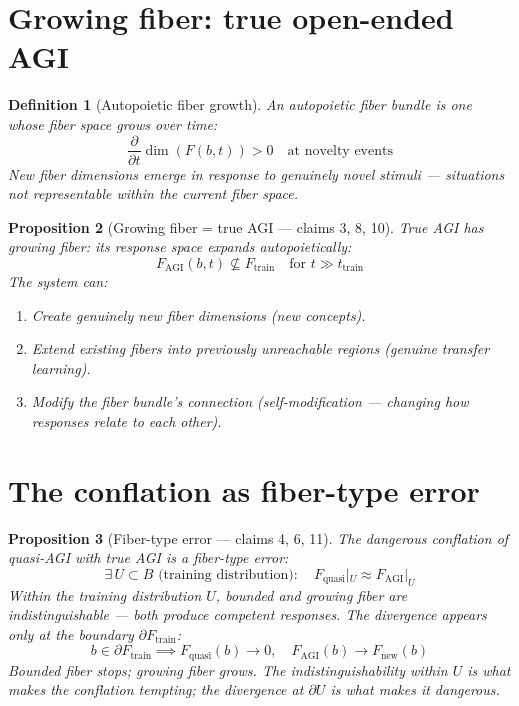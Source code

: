 \documentclass[11pt,a4paper]{article}
\newtheorem{definition}{Definition}[section]
\newtheorem{proposition}[definition]{Proposition}
\begin{document}
\section{Growing fiber: true open-ended AGI}

\begin{definition}[Autopoietic fiber growth]
An \emph{autopoietic fiber bundle} is one whose fiber space grows over time:
\[
  \frac{\partial}{\partial t} \dim(F(b, t)) > 0 \quad \text{at novelty events}
\]
New fiber dimensions emerge in response to genuinely novel stimuli ---
situations not representable within the current fiber space.
\end{definition}

\begin{proposition}[Growing fiber = true AGI --- claims 3, 8, 10]
\label{prop:growing}
True AGI has \emph{growing fiber}: its response space expands autopoietically:
\[
  F_{\text{AGI}}(b, t) \not\subseteq F_{\text{train}} \quad \text{for } t \gg t_{\text{train}}
\]
The system can:
\begin{enumerate}
  \item Create genuinely new fiber dimensions (new concepts).
  \item Extend existing fibers into previously unreachable regions
    (genuine transfer learning).
  \item Modify the fiber bundle's connection (self-modification ---
    changing how responses relate to each other).
\end{enumerate}
\end{proposition}

\section{The conflation as fiber-type error}

\begin{proposition}[Fiber-type error --- claims 4, 6, 11]
\label{prop:conflation}
The dangerous conflation of quasi-AGI with true AGI is a \emph{fiber-type error}:
\[
  \exists\, U \subset B \text{ (training distribution)}: \quad
  F_{\text{quasi}}|_U \approx F_{\text{AGI}}|_U
\]
Within the training distribution $U$, bounded and growing fiber are
indistinguishable --- both produce competent responses. The divergence
appears only at the boundary $\partial F_{\text{train}}$:
\[
  b \in \partial F_{\text{train}} \implies
  F_{\text{quasi}}(b) \to 0, \quad F_{\text{AGI}}(b) \to F_{\text{new}}(b)
\]
Bounded fiber stops; growing fiber grows. The indistinguishability within
$U$ is what makes the conflation tempting; the divergence at $\partial U$
is what makes it dangerous.
\end{proposition}
\end{document}
